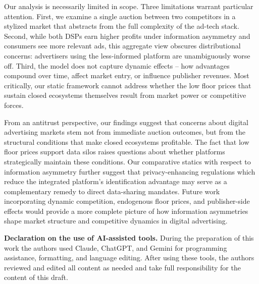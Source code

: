 \documentclass[11pt]{article}
\theoremstyle{plain}
\theoremstyle{definition}
\theoremstyle{plain}
\theoremstyle{plain}
\theoremstyle{plain}
\theoremstyle{plain}
\numberwithin{equation}{section}
\begin{document}
\vspace{2mm}
\noindent Our analysis is necessarily limited in scope. Three limitations warrant particular attention. First, we examine a single auction between two competitors in a stylized market that abstracts from the full complexity of the ad-tech stack. Second, while both DSPs earn higher profits under information asymmetry and consumers see more relevant ads, this aggregate view obscures distributional concerns: advertisers using the less-informed platform are unambiguously worse off. Third, the model does not capture dynamic effects -- how advantages compound over time, affect market entry, or influence publisher revenues. Most critically, our static framework cannot address whether the low floor prices that sustain closed ecosystems themselves result from market power or competitive forces.\par 
\vspace{2mm}
\noindent From an antitrust perspective, our findings suggest that concerns about digital advertising markets stem not from immediate auction outcomes, but from the structural conditions that make closed ecosystems profitable. The fact that low floor prices support data silos raises questions about whether platforms strategically maintain these conditions. Our comparative statics with respect to information asymmetry further suggest that privacy-enhancing regulations which reduce the integrated platform's identification advantage may serve as a complementary remedy to direct data-sharing mandates. Future work incorporating dynamic competition, endogenous floor prices, and publisher-side effects would provide a more complete picture of how information asymmetries shape market structure and competitive dynamics in digital advertising.
\vspace{4mm}

\noindent\textbf{Declaration on the use of AI-assisted tools.} During the preparation of this work the authors used Claude, ChatGPT, and Gemini for programming assistance, formatting, and language editing. After using these tools, the authors reviewed and edited all content as needed and take full responsibility for the content of this draft.

\vspace{8mm} 
\printbibliography[title={References}]
\vspace{8mm}

\clearpage

\renewcommand{\thesection}{\Alph{section}}
\setcounter{section}{0}
\end{document}
